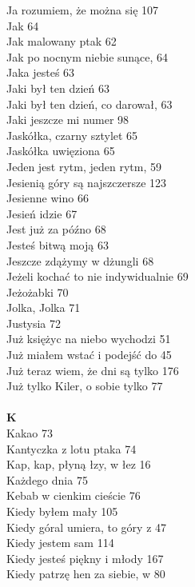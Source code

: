 \documentclass[a5paper, 10pt]{book}
\begin{document}
{\begin{multicols}{3}
    Ja rozumiem, że można się 107\\
    Jak 64\\
    Jak malowany ptak 62\\
    Jak po nocnym niebie sunące, 64\\
    Jaka jesteś 63\\
    Jaki był ten dzień 63\\
    Jaki był ten dzień, co darował, 63\\
    Jaki jeszcze mi numer 98\\
    Jaskółka, czarny sztylet 65\\
    Jaskółka uwięziona 65\\
    Jeden jest rytm, jeden rytm, 59\\
    Jesienią góry są najszczersze 123\\
    Jesienne wino 66\\
    Jesień idzie 67\\
    Jest już za późno 68\\
    Jesteś bitwą moją 63\\
    Jeszcze zdążymy w dżungli 68\\
    Jeżeli kochać to nie indywidualnie 69\\
    Jeżożabki 70\\
    Jolka, Jolka 71\\
    Justysia 72\\
    Już księżyc na niebo wychodzi 51\\
    Już miałem wstać i podejść do 45\\
    Już teraz wiem, że dni są tylko 176\\
    Już tylko Kiler, o sobie tylko 77\\
    \\
    {\footnotesize \textbf{K\\} }
    Kakao 73\\
    Kantyczka z lotu ptaka 74\\
    Kap, kap, płyną łzy, w łez 16\\
    Każdego dnia 75\\
    Kebab w cienkim cieście 76\\
    Kiedy byłem mały 105\\
    Kiedy góral umiera, to góry z 47\\
    Kiedy jestem sam 114\\
    Kiedy jesteś piękny i młody 167\\
    Kiedy patrzę hen za siebie, w 80\\

\end{multicols}}
\end{document}

